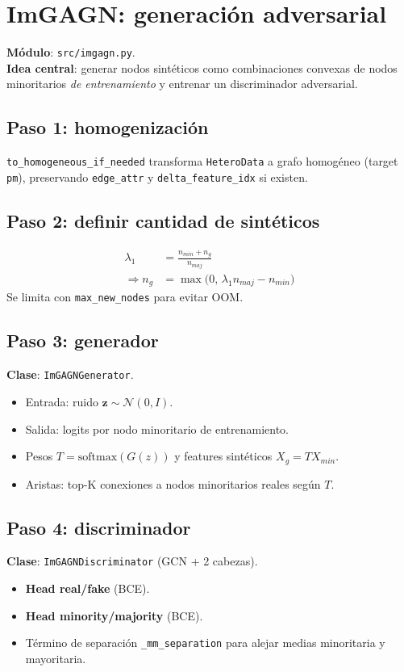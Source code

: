 \section{ImGAGN: generaci\'on adversarial}
\label{sec:imgagn}
\textbf{M\'odulo}: \texttt{src/imgagn.py}.\\
\textbf{Idea central}: generar nodos sint\'eticos como combinaciones convexas de nodos minoritarios \emph{de entrenamiento} y entrenar un discriminador adversarial.

\subsection{Paso 1: homogenizaci\'on}
\texttt{to\_homogeneous\_if\_needed} transforma \texttt{HeteroData} a grafo homog\'eneo (target \texttt{pm}), preservando \texttt{edge\_attr} y \texttt{delta\_feature\_idx} si existen.

\subsection{Paso 2: definir cantidad de sint\'eticos}
\begin{align*}
\lambda_1 &= \frac{n_{min} + n_g}{n_{maj}} \\
\Rightarrow n_g &= \max\bigl(0,\, \lambda_1 n_{maj} - n_{min}\bigr)
\end{align*}
Se limita con \texttt{max\_new\_nodes} para evitar OOM.

\subsection{Paso 3: generador}
\textbf{Clase}: \texttt{ImGAGNGenerator}.\\
\begin{itemize}[leftmargin=*]
  \item Entrada: ruido $\mathbf{z} \sim \mathcal{N}(0, I)$.
  \item Salida: logits por nodo minoritario de entrenamiento.
  \item Pesos $T = \mathrm{softmax}(G(z))$ y features sint\'eticos $X_g = T X_{min}$.
  \item Aristas: top-K conexiones a nodos minoritarios reales seg\'un $T$.
\end{itemize}

\subsection{Paso 4: discriminador}
\textbf{Clase}: \texttt{ImGAGNDiscriminator} (GCN + 2 cabezas).
\begin{itemize}[leftmargin=*]
  \item \textbf{Head real/fake} (BCE).
  \item \textbf{Head minority/majority} (BCE).
  \item T\'ermino de separaci\'on \texttt{\_mm\_separation} para alejar medias minoritaria y mayoritaria.
\end{itemize}

